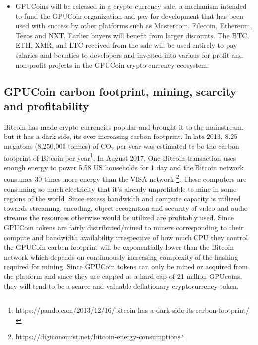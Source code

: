\documentclass{article}
\begin{document}
\begin{itemize}

\item GPUCoins will be released in a crypto-currency sale,
 a mechanism intended to fund the GPUCoin organization and pay for development that has been used with success by other platforms such as Mastercoin, Filecoin, Ethereum, Tezos and NXT.
Earlier buyers will benefit from larger discounts. The BTC, ETH, XMR, and LTC received from the sale will be used entirely to pay salaries and bounties to developers and invested into various for-profit and non-profit projects in the GPUCoin crypto-currency ecosystem.

\end{itemize}



\subsection{GPUCoin carbon footprint, mining, scarcity and profitability}
Bitcoin has made crypto-currencies popular and brought it to the mainstream, but it has a dark side, its ever increasing carbon footprint. In late 2013, 8.25 megatons (8,250,000 tonnes) of CO$_2$ per year was estimated to be the carbon footprint of Bitcoin per year\footnote{https://pando.com/2013/12/16/bitcoin-has-a-dark-side-its-carbon-footprint/}. In August 2017, One Bitcoin transaction uses enough energy to power 5.58 US households for 1 day and the Bitcoin network consumes 30 times more energy than the VISA network \footnote{https://digiconomist.net/bitcoin-energy-consumption}. These computers are consuming so much electricity that it’s already unprofitable to mine in some regions of the world. Since excess bandwidth and compute capacity is utilized towards streaming, encoding, object recognition and security of video and audio streams the resources otherwise would be utilized are profitably used. Since GPUCoin tokens are fairly distributed/mined to miners corresponding to their compute and bandwidth availability irrespective of how much CPU they control, the GPUCoin carbon footprint will be exponentially lower than the Bitcoin network which depends on continuously increasing complexity of the hashing required for mining. Since GPUCoin tokens can only be mined or acquired from the platform and since they are capped at a hard cap of 21 million GPUcoins, they will tend to be a scarce and valuable deflationary cryptocurrency token.
\end{document}
